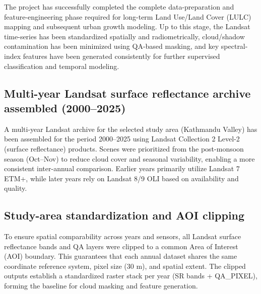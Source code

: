 The project has successfully completed the complete data-preparation and feature-engineering phase required for long-term Land Use/Land Cover (LULC) mapping and subsequent urban growth modeling. Up to this stage, the Landsat time-series has been standardized spatially and radiometrically, cloud/shadow contamination has been minimized using QA-based masking, and key spectral-index features have been generated consistently for further supervised classification and temporal modeling.

\subsection{Multi-year Landsat surface reflectance archive assembled (2000--2025)}
A multi-year Landsat archive for the selected study area (Kathmandu Valley) has been assembled for the period 2000--2025 using Landsat Collection 2 Level-2 (surface reflectance) products. Scenes were prioritized from the post-monsoon season (Oct--Nov) to reduce cloud cover and seasonal variability, enabling a more consistent inter-annual comparison. Earlier years primarily utilize Landsat 7 ETM+, while later years rely on Landsat 8/9 OLI based on availability and quality.

\subsection{Study-area standardization and AOI clipping}
To ensure spatial comparability across years and sensors, all Landsat surface reflectance bands and QA layers were clipped to a common Area of Interest (AOI) boundary. This guarantees that each annual dataset shares the same coordinate reference system, pixel size (30 m), and spatial extent. The clipped outputs establish a standardized raster stack per year (SR bands + QA\_PIXEL), forming the baseline for cloud masking and feature generation.

